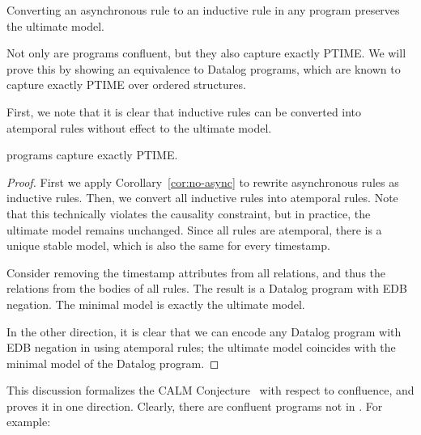 \begin{corollary}
\label{cor:no-async}
Converting an asynchronous rule to an inductive rule in any \slang program preserves the ultimate model.
\end{corollary}

Not only are \slang programs confluent, but they also capture exactly PTIME.  We will prove this by showing an equivalence to Datalog programs, which are known to capture exactly PTIME over ordered structures.

First, we note that it is clear that inductive rules can be converted into atemporal rules without effect to the ultimate model.


\begin{theorem}
\slang programs capture exactly PTIME.
\end{theorem}
\begin{proof}
First we apply Corollary~\ref{cor:no-async} to rewrite asynchronous rules as inductive rules.  Then, we convert all inductive rules into atemporal rules.  Note that this technically violates the causality constraint, but in practice, the ultimate model remains unchanged.  Since all rules are atemporal, there is a unique stable model, which is also the same for every timestamp.

Consider removing the timestamp attributes from all relations, and thus the  relations from the bodies of all rules.  The result is a Datalog program with EDB negation.  The minimal model is exactly the ultimate model.

In the other direction, it is clear that we can encode any Datalog program with EDB negation in \slang using atemporal rules; the ultimate model coincides with the minimal model of the Datalog program.
\end{proof}



This discussion formalizes the CALM Conjecture~\cite{declarative-imperative} with respect to confluence, and proves it in one direction. 
Clearly, there are confluent programs not in \slang.  For example:

